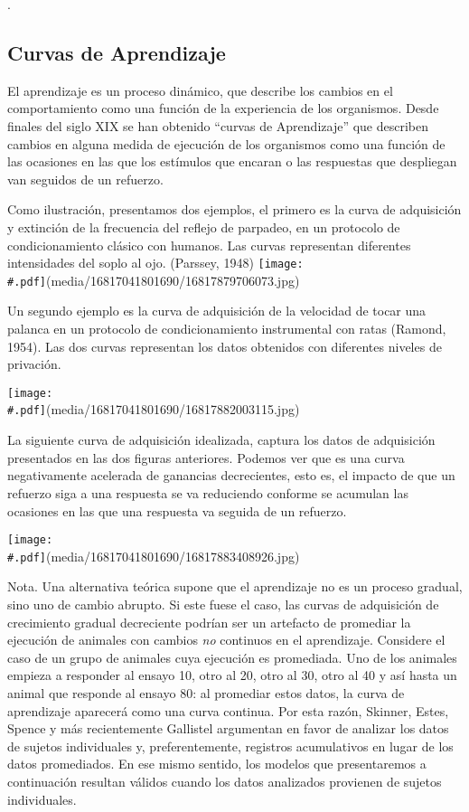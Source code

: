 \documentclass[
  a4paper,
  DIV=11,
  numbers=noendperiod]{scrreprt}
\begin{document}
.

\subsection{Curvas de Aprendizaje}\label{curvas-de-aprendizaje}

El aprendizaje es un proceso dinámico, que describe los cambios en el
comportamiento como una función de la experiencia de los organismos.
Desde finales del siglo XIX se han obtenido ``curvas de Aprendizaje''
que describen cambios en alguna medida de ejecución de los organismos
como una función de las ocasiones en las que los estímulos que encaran o
las respuestas que despliegan van seguidos de un refuerzo.

Como ilustración, presentamos dos ejemplos, el primero es la curva de
adquisición y extinción de la frecuencia del reflejo de parpadeo, en un
protocolo de condicionamiento clásico con humanos. Las curvas
representan diferentes intensidades del soplo al ojo. (Parssey, 1948)
\texttt{[image: \\\#.pdf]}(media/16817041801690/16817879706073.jpg)

Un segundo ejemplo es la curva de adquisición de la velocidad de tocar
una palanca en un protocolo de condicionamiento instrumental con ratas
(Ramond, 1954). Las dos curvas representan los datos obtenidos con
diferentes niveles de privación.

\texttt{[image: \\\#.pdf]}(media/16817041801690/16817882003115.jpg)

La siguiente curva de adquisición idealizada, captura los datos de
adquisición presentados en las dos figuras anteriores. Podemos ver que
es una curva negativamente acelerada de ganancias decrecientes, esto es,
el impacto de que un refuerzo siga a una respuesta se va reduciendo
conforme se acumulan las ocasiones en las que una respuesta va seguida
de un refuerzo.

\texttt{[image: \\\#.pdf]}(media/16817041801690/16817883408926.jpg)

Nota. Una alternativa teórica supone que el aprendizaje no es un proceso
gradual, sino uno de cambio abrupto. Si este fuese el caso, las curvas
de adquisición de crecimiento gradual decreciente podrían ser un
artefacto de promediar la ejecución de animales con cambios \emph{no}
continuos en el aprendizaje. Considere el caso de un grupo de animales
cuya ejecución es promediada. Uno de los animales empieza a responder al
ensayo 10, otro al 20, otro al 30, otro al 40 y así hasta un animal que
responde al ensayo 80: al promediar estos datos, la curva de aprendizaje
aparecerá como una curva continua. Por esta razón, Skinner, Estes,
Spence y más recientemente Gallistel argumentan en favor de analizar los
datos de sujetos individuales y, preferentemente, registros acumulativos
en lugar de los datos promediados. En ese mismo sentido, los modelos que
presentaremos a continuación resultan válidos cuando los datos
analizados provienen de sujetos individuales.
\end{document}
